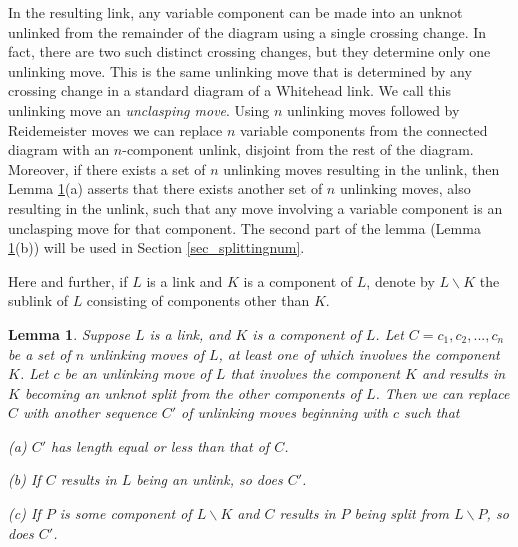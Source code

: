 \documentclass[12pt]{amsart}
\newtheorem{lemma}[thm]{Lemma}
\theoremstyle{definition}
\theoremstyle{remark}
\begin{document}
In the resulting link, any variable component can be made into an unknot unlinked from the remainder of the diagram using a single crossing change.
In fact, there are two such distinct crossing changes, but they determine only one unlinking move. This is the same unlinking move that is determined by any crossing change in a standard diagram of a Whitehead link.
We call this unlinking move an \emph{unclasping move}.
Using $n$ unlinking moves followed by Reidemeister moves we can replace $n$ variable components from the connected diagram with an $n$-component unlink, disjoint from the rest of the diagram.
Moreover, if there exists a set of $n$ unlinking moves resulting in the unlink, then Lemma \ref{lem_unlinking}(a) asserts that there exists another set of $n$ unlinking moves, also resulting in the unlink, such that any move involving a variable component is an unclasping move for that component.
The second part of the lemma (Lemma \ref{lem_unlinking}(b)) will be used in Section \ref{sec_splittingnum}.

Here and further, if $L$ is a link and $K$ is a component of $L$, denote by $L \backslash K$ the sublink of $L$ consisting of components other than $K$.


\begin{lemma}
\label{lem_unlinking}
Suppose $L$ is a link, and $K$ is a component of $L$.
Let $C=c_1, c_2, ..., c_n$ be a set of $n$ unlinking moves of $L$, at least one of which involves the component $K$.
Let $c$ be an unlinking move of $L$ that involves the component $K$ and results in $K$ becoming an unknot split from the other components of $L$.
Then we can replace $C$ with another sequence $C'$ of unlinking moves beginning with $c$ such that
\vspace{0.1in}

(a) $C'$ has length equal or less than that of $C$.

(b) If $C$ results in $L$ being an unlink, so does $C'$.
\vspace{0.1in}

(c) If $P$ is some component of $L \backslash K$ and $C$ results in $P$ being split from $L \backslash P$, so does $C'$.
\end{lemma}
\end{document}
